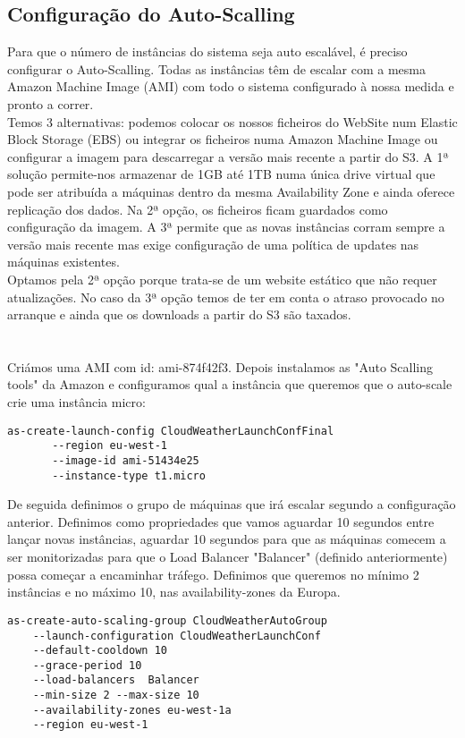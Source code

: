 \subsection{Configuração do Auto-Scalling}
Para que o número de instâncias do sistema seja auto escalável, é preciso configurar o Auto-Scalling. Todas as instâncias têm de escalar com a mesma Amazon Machine Image (AMI) com todo o sistema configurado à nossa medida e pronto a correr. \\
Temos 3 alternativas: podemos colocar os nossos ficheiros do WebSite num Elastic Block Storage (EBS) ou integrar os ficheiros numa Amazon Machine Image ou configurar a imagem para descarregar a versão mais recente a partir do S3. A 1ª solução permite-nos armazenar de 1GB até 1TB numa única drive virtual que pode ser atribuída a máquinas dentro da mesma Availability Zone e ainda oferece replicação dos dados. Na 2ª opção, os ficheiros ficam guardados como configuração da imagem. A 3ª permite que as novas instâncias corram sempre a versão mais recente mas exige configuração de uma política de updates nas máquinas existentes.\\
Optamos pela 2ª opção porque trata-se de um website estático que não requer atualizações. No caso da 3ª opção temos de ter em conta o atraso provocado no arranque e ainda que os downloads a partir do S3 são taxados.\\
\\
\\

Criámos uma AMI com id: ami-874f42f3.  Depois instalamos as "Auto Scalling tools" da Amazon e configuramos qual a instância que queremos que o auto-scale crie uma instância micro:

\lstset{language=Bash} 
\begin{lstlisting}
as-create-launch-config CloudWeatherLaunchConfFinal 
       --region eu-west-1
       --image-id ami-51434e25
       --instance-type t1.micro
\end{lstlisting}
De seguida definimos o grupo de máquinas que irá escalar segundo a configuração anterior. Definimos como propriedades que vamos aguardar 10 segundos entre lançar novas instâncias, aguardar 10 segundos para que as máquinas comecem a ser monitorizadas para que o Load Balancer "Balancer" (definido anteriormente) possa começar a encaminhar tráfego. Definimos que queremos no mínimo 2 instâncias e no máximo 10, nas availability-zones da Europa.\\


\lstset{language=Bash} 
\begin{lstlisting}
as-create-auto-scaling-group CloudWeatherAutoGroup 
	--launch-configuration CloudWeatherLaunchConf 
	--default-cooldown 10  
	--grace-period 10 
	--load-balancers  Balancer 
	--min-size 2 --max-size 10 
	--availability-zones eu-west-1a 
	--region eu-west-1
\end{lstlisting}


